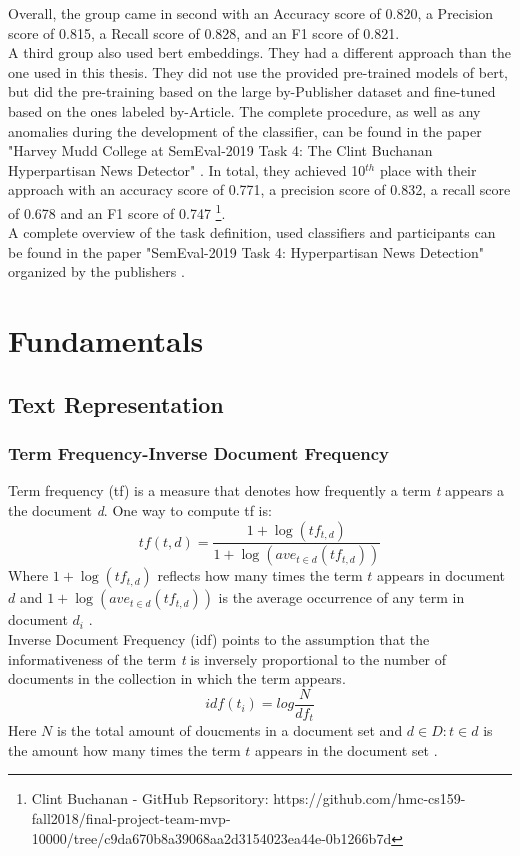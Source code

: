\documentclass[a4paper, 11pt,titlepage,oneside,openany]{book}
\begin{document}
\newpage 
\noindent Overall, the group came in second with an Accuracy score of 0.820, a Precision score of 0.815, a Recall score of 0.828, and an F1 score of 0.821. \\
\indent A third group also used \gls{bert} embeddings. They had a different approach than the one used in this thesis. They did not use the provided pre-trained models of \gls{bert}, but did the pre-training based on the large by-Publisher dataset and fine-tuned based on the ones labeled by-Article. The complete procedure, as well as any anomalies during the development of the classifier, can be found in the paper "Harvey Mudd College at SemEval-2019 Task 4: The Clint Buchanan Hyperpartisan News Detector" \cite{bertgruppe}. In total, they achieved 10$^{th}$ place with their approach with an accuracy score of 0.771, a precision score of 0.832, a recall score of 0.678 and an F1 score of 0.747 \footnote{Clint Buchanan - GitHub Repsoritory: https://github.com/hmc-cs159-fall2018/final-project-team-mvp-10000/tree/c9da670b8a39068aa2d3154023ea44e-0b1266b7d}. \\
\indent A complete overview of the task definition, used classifiers and participants can be found in the paper "SemEval-2019 Task 4: Hyperpartisan News Detection" organized by the publishers \cite{hyperpartisannewsdetection}.


\chapter{Fundamentals}
\section{Text Representation}
\subsection{Term Frequency-Inverse Document Frequency}
\indent Term frequency (\gls{tf}) is a measure that denotes how frequently a term \textit{t} appears a the document \textit{d}. One way to compute \gls{tf} is:\\
\[
tf(t,d)=\frac{1+\log(tf_{t,d})}{1+\log(ave_{t\in d}(tf_{t,d}))}
\]
Where $1+\log(tf_{t,d})$ reflects how many times the term $t$ appears in document $d$ and $1+\log(ave_{t\in d}(tf_{t,d}))$ is the average occurrence of any term in document $d_i$ \cite{IR-book}.\\

\indent Inverse Document Frequency (\gls{idf}) points to the assumption that the informativeness of the term \textit{t} is inversely proportional to the number of documents in the collection in which the term appears.\\
\[
idf(t_i)=log\frac{N}{df_t}
\]
Here $N$ is the total amount of doucments in a document set and $d \in D : t \in d$ is the amount how many times the term $t$ appears in the document set \cite{IR-book}.\\
\end{document}
